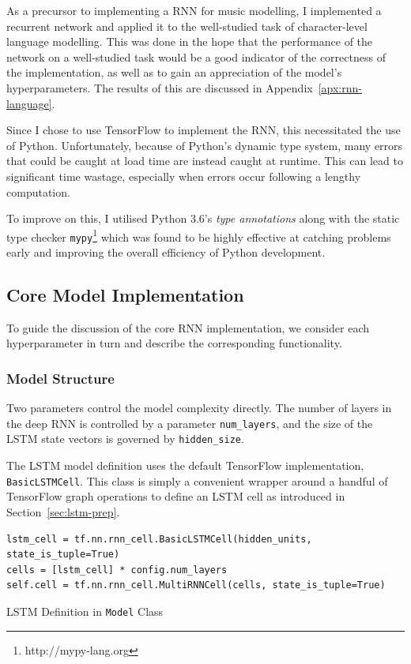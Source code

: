 \documentclass[12pt,a4paper,twoside,openright]{report}
\newcommand{\sref}[1]{Section~\ref{#1}}
\begin{document}
As a precursor to implementing a RNN for music modelling, I implemented a
recurrent network and applied it to the well-studied task of character-level
language modelling. This was done in the hope that the performance of the
network on a well-studied task would be a good indicator of the correctness of
the implementation, as well as to gain an appreciation of the model's
hyperparameters. The results of this are discussed in
Appendix~\ref{apx:rnn-language}.

Since I chose to use TensorFlow to implement the RNN, this necessitated the use
of Python. Unfortunately, because of Python's dynamic type system, many errors
that could be caught at load time are instead caught at runtime. This can lead
to significant time wastage, especially when errors occur following a lengthy
computation. 

To improve on this, I utilised Python 3.6's \emph{type annotations} along with
the static type checker \texttt{mypy}\footnote{http://mypy-lang.org} which was
found to be highly effective at catching problems early and improving the
overall efficiency of Python development.

\subsection{Core Model Implementation}

To guide the discussion of the core RNN implementation, we consider each
hyperparameter in turn and describe the corresponding functionality.

\subsubsection{Model Structure}

Two parameters control the model complexity directly. The number of layers in
the deep RNN is controlled by a parameter \texttt{num\_layers}, and the size of
the LSTM state vectors is governed by \texttt{hidden\_size}.

The LSTM model definition uses the default TensorFlow implementation,
\texttt{BasicLSTMCell}. This class is simply a convenient wrapper around a
handful of TensorFlow graph operations to define an LSTM cell as introduced in
\sref{sec:lstm-prep}. 

\begin{listing}
  \begin{verbatim}
lstm_cell = tf.nn.rnn_cell.BasicLSTMCell(hidden_units, state_is_tuple=True)
cells = [lstm_cell] * config.num_layers
self.cell = tf.nn.rnn_cell.MultiRNNCell(cells, state_is_tuple=True)
  \end{verbatim}
  \caption{LSTM Definition in \texttt{Model} Class}
\end{listing}
\end{document}

